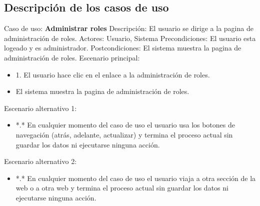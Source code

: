 \subsection{Descripción de los casos de uso}
Caso de uso:  \textbf{Administrar roles}
\newline
Descripción: El usuario se dirige a la pagina de administración de roles.
\newline
Actores: Usuario, Sistema
\newline
Precondiciones: El usuario esta logeado y es administrador.
\newline
Postcondiciones: El sistema muestra la pagina de administración de roles.
\newline
Escenario principal:
\begin{itemize}
	\item 1. El usuario hace clic en el enlace a la administración de roles.
	\item El sistema muestra la pagina de administración de roles.
\end{itemize}

Escenario alternativo 1: 
\begin{itemize}
	\item *.* En cualquier momento del caso de uso el usuario usa los botones de navegación (atrás, adelante, actualizar) y termina el proceso actual sin guardar los datos ni ejecutarse ninguna acción.
\end{itemize}
Escenario alternativo 2:
\begin{itemize}
\item *.* En cualquier momento del caso de uso el usuario viaja a otra sección de la web o a otra web y termina el proceso actual sin guardar los datos ni ejecutarse ninguna acción.
\end{itemize}

